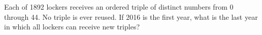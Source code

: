 Each of 1892 lockers receives an ordered triple of distinct numbers from 0 through 44. No triple is ever reused. If 2016 is the first year, what is the last year in which all lockers can receive new triples?
